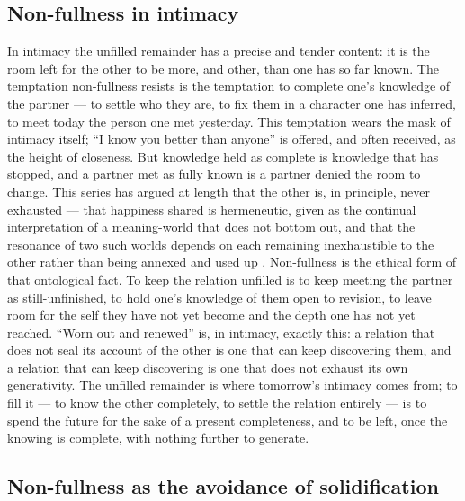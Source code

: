 \subsection{Non-fullness in intimacy}
\label{p20:sub:nonfull-intimacy}

In intimacy the unfilled remainder has a precise and tender content: it is the room left for the other to be more, and other, than one has so far known. The temptation non-fullness resists is the temptation to complete one's knowledge of the partner --- to settle who they are, to fix them in a character one has inferred, to meet today the person one met yesterday. This temptation wears the mask of intimacy itself; ``I know you better than anyone'' is offered, and often received, as the height of closeness. But knowledge held as complete is knowledge that has stopped, and a partner met as fully known is a partner denied the room to change. This series has argued at length that the other is, in principle, never exhausted --- that happiness shared is hermeneutic, given as the continual interpretation of a meaning-world that does not bottom out, and that the resonance of two such worlds depends on each remaining inexhaustible to the other rather than being annexed and used up \parencite{paperxix}. Non-fullness is the ethical form of that ontological fact. To keep the relation unfilled is to keep meeting the partner as still-unfinished, to hold one's knowledge of them open to revision, to leave room for the self they have not yet become and the depth one has not yet reached. ``Worn out and renewed'' is, in intimacy, exactly this: a relation that does not seal its account of the other is one that can keep discovering them, and a relation that can keep discovering is one that does not exhaust its own generativity. The unfilled remainder is where tomorrow's intimacy comes from; to fill it --- to know the other completely, to settle the relation entirely --- is to spend the future for the sake of a present completeness, and to be left, once the knowing is complete, with nothing further to generate.

\subsection{Non-fullness as the avoidance of solidification}
\label{p20:sub:nonfull-formal}

